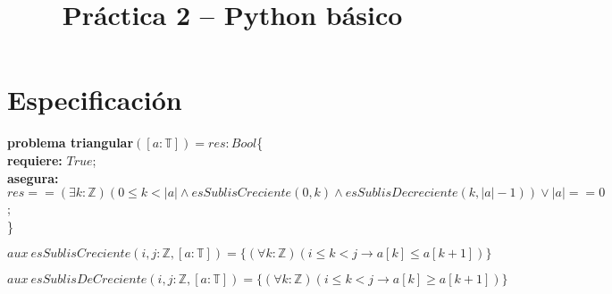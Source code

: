 \documentclass[10pt,a4paper]{article}
\title{Práctica 2 – Python básico}
\date{}
\begin{document}
\section*{Especificación}

\textbf{problema triangular}$([a:\mathbb{T}])=res:Bool$\{ \\
	\textbf{  requiere:} $True$;\\
	\textbf{  asegura:}$res == (\exists k:\mathbb{Z})(0 \leq k < |a| \wedge esSublisCreciente(0,k) \wedge esSublisDecreciente(k,|a|-1) ) \vee |a|==0$;\\
	\}
	
$$aux\ esSublisCreciente(i,j:\mathbb{Z},[a:\mathbb{T}])= \{(\forall k:\mathbb{Z})(i\leq k < j\rightarrow a[k]\leq a[k+1] ) \} $$

$$aux\ esSublisDeCreciente(i,j:\mathbb{Z},[a:\mathbb{T}])= \{(\forall k:\mathbb{Z})(i\leq k < j\rightarrow a[k]\geq a[k+1] ) \} $$
	
\end{document}
